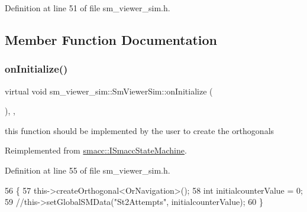 Definition at line 51 of file sm\+\_\+viewer\+\_\+sim.\+h.



\subsection{Member Function Documentation}
\mbox{\label{structsm__viewer__sim_1_1SmViewerSim_a1ad4e963a078af53a55097c6eb78cae0}} 
\subsubsection{\texorpdfstring{on\+Initialize()}{onInitialize()}}
{\footnotesize\ttfamily virtual void sm\+\_\+viewer\+\_\+sim\+::\+Sm\+Viewer\+Sim\+::on\+Initialize (\begin{DoxyParamCaption}{ }\end{DoxyParamCaption})\hspace{0.3cm}{\ttfamily [inline]}, {\ttfamily [override]}, {\ttfamily [virtual]}}



this function should be implemented by the user to create the orthogonals 



Reimplemented from \hyperlink{classsmacc_1_1ISmaccStateMachine_ac2982c6c8283663e5e1e8a7c82f511ec}{smacc\+::\+I\+Smacc\+State\+Machine}.



Definition at line 55 of file sm\+\_\+viewer\+\_\+sim.\+h.


\begin{DoxyCode}
56     \{
57         this->createOrthogonal<OrNavigation>();
58         \textcolor{keywordtype}{int} initialcounterValue = 0;
59         \textcolor{comment}{//this->setGlobalSMData("St2Attempts", initialcounterValue);}
60     \}
\end{DoxyCode}
\mbox{\label{structsm__viewer__sim_1_1SmViewerSim_a7b9ef19f73db25f93b1b540eb744365b}} 
